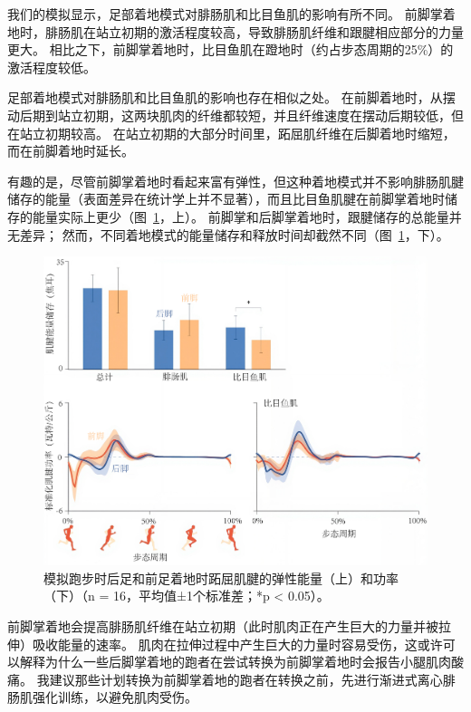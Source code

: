 我们的模拟显示，足部着地模式对腓肠肌和比目鱼肌的影响有所不同。
前脚掌着地时，腓肠肌在站立初期的激活程度较高，导致腓肠肌纤维和跟腱相应部分的力量更大。
相比之下，前脚掌着地时，比目鱼肌在蹬地时（约占步态周期的25\%）的激活程度较低。


足部着地模式对腓肠肌和比目鱼肌的影响也存在相似之处。
在前脚着地时，从摆动后期到站立初期，这两块肌肉的纤维都较短，并且纤维速度在摆动后期较低，但在站立初期较高。
在站立初期的大部分时间里，跖屈肌纤维在后脚着地时缩短，而在前脚着地时延长。


有趣的是，尽管前脚掌着地时看起来富有弹性，但这种着地模式并不影响腓肠肌腱储存的能量（表面差异在统计学上并不显著），而且比目鱼肌腱在前脚掌着地时储存的能量实际上更少（图~\ref{fig:12_11}，上）。
前脚掌和后脚掌着地时，跟腱储存的总能量并无差异；
然而，不同着地模式的能量储存和释放时间却截然不同（图~\ref{fig:12_11}，下）。

\begin{figure}[!htb]
	\centering
	\includegraphics[width=1.0\linewidth]{chap12/12_11}
	\caption{模拟跑步时后足和前足着地时跖屈肌腱的弹性能量（上）和功率（下）（n = 16，平均值±1个标准差；*p < 0.05）\cite{yong2020foot}。\label{fig:12_11}}
\end{figure}


前脚掌着地会提高腓肠肌纤维在站立初期（此时肌肉正在产生巨大的力量并被拉伸）吸收能量的速率。
肌肉在拉伸过程中产生巨大的力量时容易受伤，这或许可以解释为什么一些后脚掌着地的跑者在尝试转换为前脚掌着地时会报告小腿肌肉酸痛。
我建议那些计划转换为前脚掌着地的跑者在转换之前，先进行渐进式离心腓肠肌强化训练，以避免肌肉受伤。


